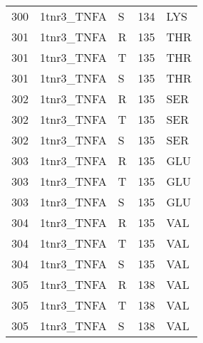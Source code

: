 \begin{longtable}[l]{l|l|l|l|l}
	300 & 1tnr3_TNFA & S & 134 & LYS \\
	301 & 1tnr3_TNFA & R & 135 & THR \\
	301 & 1tnr3_TNFA & T & 135 & THR \\
	301 & 1tnr3_TNFA & S & 135 & THR \\
	302 & 1tnr3_TNFA & R & 135 & SER \\
	302 & 1tnr3_TNFA & T & 135 & SER \\
	302 & 1tnr3_TNFA & S & 135 & SER \\
	303 & 1tnr3_TNFA & R & 135 & GLU \\
	303 & 1tnr3_TNFA & T & 135 & GLU \\
	303 & 1tnr3_TNFA & S & 135 & GLU \\
	304 & 1tnr3_TNFA & R & 135 & VAL \\
	304 & 1tnr3_TNFA & T & 135 & VAL \\
	304 & 1tnr3_TNFA & S & 135 & VAL \\
	305 & 1tnr3_TNFA & R & 138 & VAL \\
	305 & 1tnr3_TNFA & T & 138 & VAL \\
	305 & 1tnr3_TNFA & S & 138 & VAL \\
\end{longtable}